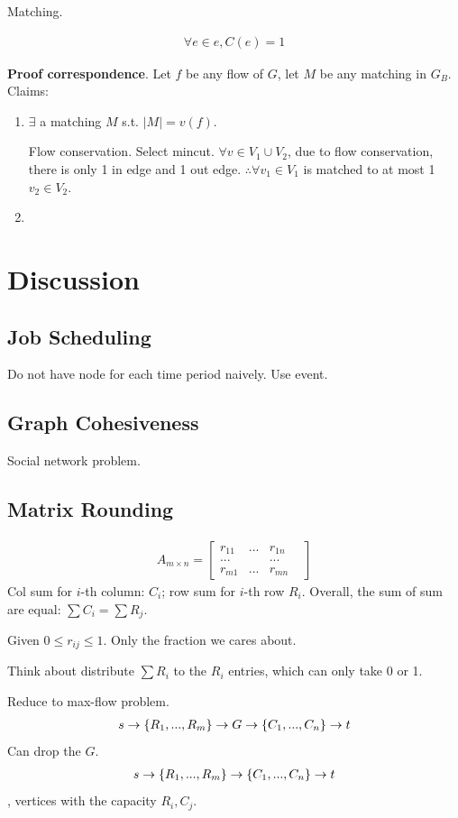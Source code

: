 \documentclass[a4paper]{report}
\begin{document}
Matching. 

\begin{align*}
\forall e \in e, C(e) =1
\end{align*}

\textbf{Proof correspondence}. Let $f$ be any flow of $G$, let $M$ be any matching in $G_B$. Claims:
\begin{enumerate}
\item $\exists$ a matching $M$ s.t. $|M|=v(f)$.

Flow conservation. Select mincut. $\forall v \in V_1\cup V_2$, due to flow conservation, there is only 1 in edge and 1 out edge. $\therefore \forall v_1 \in V_1$ is matched to at most 1 $v_2 \in V_2. $
\item 
\end{enumerate}
\section{Discussion}
\subsection{Job Scheduling}
Do not have node for each time period naively. Use event. 
\subsection{Graph Cohesiveness}
Social network problem. 

\subsection{Matrix Rounding}
\begin{align*}
A_{m\times n} = \begin{bmatrix}
r_{11} & ... & r_{1n} \\
... & &...&\\
r_{m1} & ... & r_{mn}
\end{bmatrix}
\end{align*}
Col sum for $i$-th column: $C_i$; row sum for $i$-th row $R_i$. Overall, the sum of sum are equal: $\sum C_i = \sum R_j$. 

Given $0 \leq r_{ij}\leq 1$. Only the fraction we cares about. 

Think about distribute $\sum R_i$ to the $R_i$ entries, which can only take 0 or 1.

Reduce to max-flow problem. 
\begin{align*}
s \rightarrow \{R_1, ..., R_m\} \rightarrow G \rightarrow \{C_1, ..., C_n\} \rightarrow t
\end{align*}
Can drop the $G$. 
\begin{align*}
s \rightarrow \{R_1, ..., R_m\} \rightarrow \{C_1, ..., C_n\} \rightarrow t
\end{align*}
, vertices with the capacity $R_i, C_j$. 
\end{document}
